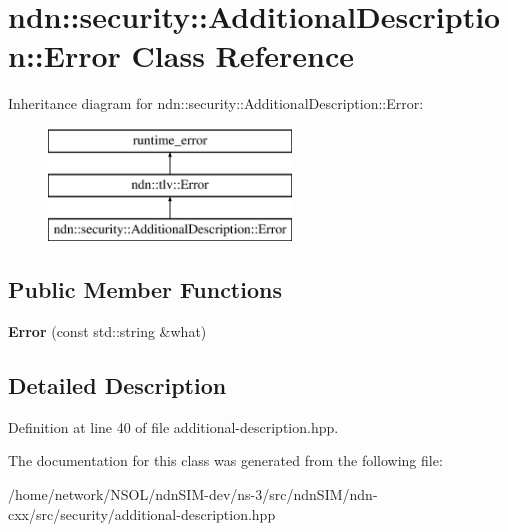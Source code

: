 \hypertarget{classndn_1_1security_1_1AdditionalDescription_1_1Error}{}\section{ndn\+:\+:security\+:\+:Additional\+Description\+:\+:Error Class Reference}
\label{classndn_1_1security_1_1AdditionalDescription_1_1Error}
Inheritance diagram for ndn\+:\+:security\+:\+:Additional\+Description\+:\+:Error\+:\begin{figure}[H]
\begin{center}
\leavevmode
\includegraphics[height=3.000000cm]{classndn_1_1security_1_1AdditionalDescription_1_1Error}
\end{center}
\end{figure}
\subsection*{Public Member Functions}
\begin{DoxyCompactItemize}
\item 
{\bfseries Error} (const std\+::string \&what)\hypertarget{classndn_1_1security_1_1AdditionalDescription_1_1Error_aa90974af7e5434e174a1674ea2c0e596}{}\label{classndn_1_1security_1_1AdditionalDescription_1_1Error_aa90974af7e5434e174a1674ea2c0e596}

\end{DoxyCompactItemize}


\subsection{Detailed Description}


Definition at line 40 of file additional-\/description.\+hpp.



The documentation for this class was generated from the following file\+:\begin{DoxyCompactItemize}
\item 
/home/network/\+N\+S\+O\+L/ndn\+S\+I\+M-\/dev/ns-\/3/src/ndn\+S\+I\+M/ndn-\/cxx/src/security/additional-\/description.\+hpp\end{DoxyCompactItemize}
